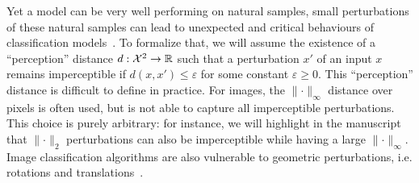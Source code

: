 Yet a model can be very well performing on natural samples, small perturbations of these natural samples can lead to unexpected and critical behaviours of classification models~\citep{biggio2013evasion,Szegedy2013IntriguingPO}. To formalize that, we will assume the existence of a ``perception'' distance $d:\mathcal{X}^2\to\mathbb{R}$ such that a perturbation $x'$ of an input $x$ remains imperceptible if $d(x,x')\leq \varepsilon$ for some constant $\varepsilon\geq0$. This ``perception'' distance is difficult to define in practice. For images, the $\lVert\cdot\rVert_\infty$ distance over pixels is often used, but is not able to capture all imperceptible perturbations.  This choice is purely arbitrary: for instance, we will highlight in the manuscript that $\lVert\cdot\rVert_2$ perturbations can also be imperceptible while having a large $\lVert\cdot\rVert_\infty$. Image classification algorithms are also vulnerable to geometric perturbations, i.e. rotations and translations~\citep{xxx}.

